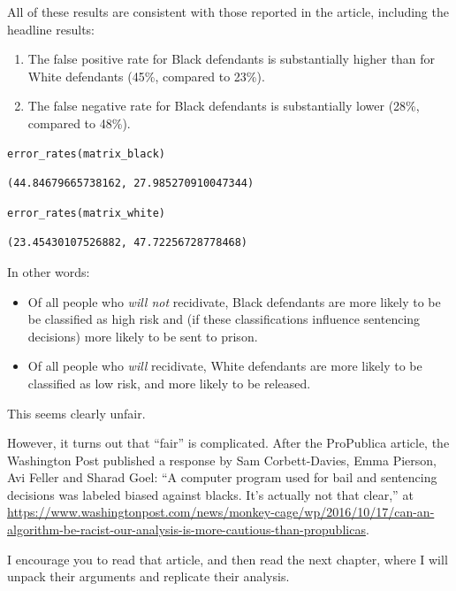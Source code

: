 All of these results are consistent with those reported in the article,
including the headline results:

\begin{enumerate}
\def\labelenumi{\arabic{enumi}.}
\item
  The false positive rate for Black defendants is substantially higher
  than for White defendants (45\%, compared to 23\%).
\item
  The false negative rate for Black defendants is substantially lower
  (28\%, compared to 48\%).
\end{enumerate}

\begin{lstlisting}[language=Python,style=source]
error_rates(matrix_black)
\end{lstlisting}

\begin{lstlisting}[style=output]
(44.84679665738162, 27.985270910047344)
\end{lstlisting}

\begin{lstlisting}[language=Python,style=source]
error_rates(matrix_white)
\end{lstlisting}

\begin{lstlisting}[style=output]
(23.45430107526882, 47.72256728778468)
\end{lstlisting}

In other words:

\begin{itemize}
\item
  Of all people who \emph{will not} recidivate, Black defendants are
  more likely to be be classified as high risk and (if these
  classifications influence sentencing decisions) more likely to be sent
  to prison.
\item
  Of all people who \emph{will} recidivate, White defendants are more
  likely to be classified as low risk, and more likely to be released.
\end{itemize}

This seems clearly unfair.

However, it turns out that ``fair'' is complicated. After the ProPublica
article, the Washington Post published a response by Sam Corbett-Davies,
Emma Pierson, Avi Feller and Sharad Goel: ``A computer program used for
bail and sentencing decisions was labeled biased against blacks. It's
actually not that clear,'' at
\url{https://www.washingtonpost.com/news/monkey-cage/wp/2016/10/17/can-an-algorithm-be-racist-our-analysis-is-more-cautious-than-propublicas}.

I encourage you to read that article, and then read the next chapter,
where I will unpack their arguments and replicate their analysis.

